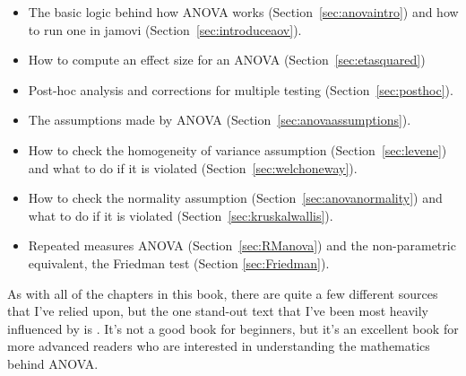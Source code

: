 \begin{itemize} \itemsep -2pt
\item The basic logic behind how ANOVA works (Section~\ref{sec:anovaintro}) and how to run one in jamovi (Section~\ref{sec:introduceaov}).
\item How to compute an effect size for an ANOVA (Section~\ref{sec:etasquared})
\item Post-hoc analysis and corrections for multiple testing (Section~\ref{sec:posthoc}).
\item The assumptions made by ANOVA (Section~\ref{sec:anovaassumptions}).
\item How to check the homogeneity of variance assumption (Section~\ref{sec:levene}) and what to do if it is violated (Section~\ref{sec:welchoneway}).
\item How to check the normality assumption (Section~\ref{sec:anovanormality}) and what to do if it is violated (Section~\ref{sec:kruskalwallis}).
\item Repeated measures ANOVA (Section~\ref{sec:RManova}) and the non-parametric equivalent, the Friedman test (Section \ref{sec:Friedman}).
\end{itemize}

As with all of the chapters in this book, there are quite a few different sources that I've relied upon, but the one stand-out text that I've been most heavily influenced by is \textcite{Sahai2000}. It's not a good book for beginners, but it's an excellent book for more advanced readers who are interested in understanding the mathematics behind ANOVA. 


